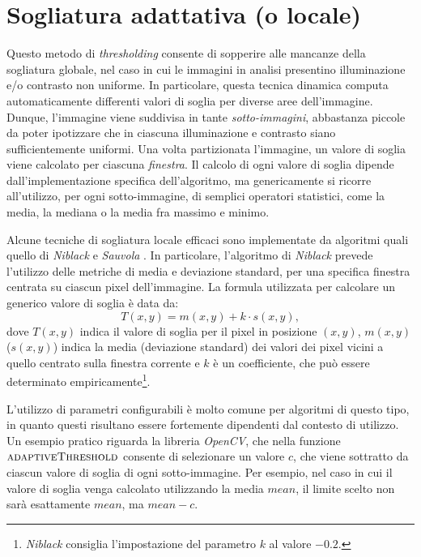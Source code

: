 \section{Sogliatura adattativa (o locale)}
\label{sec:image-bin-local}
Questo metodo di \textit{thresholding} consente di sopperire alle mancanze della sogliatura globale, nel caso in cui le immagini in analisi presentino illuminazione e/o contrasto non uniforme. In particolare, questa tecnica dinamica computa automaticamente differenti valori di soglia per diverse aree dell'immagine. Dunque, l'immagine viene suddivisa in tante \textit{sotto-immagini}, abbastanza piccole da poter ipotizzare che in ciascuna illuminazione e contrasto siano sufficientemente uniformi. Una volta partizionata l'immagine, un valore di soglia viene calcolato per ciascuna \textit{finestra}. Il calcolo di ogni valore di soglia dipende dall'implementazione specifica dell'algoritmo, ma genericamente si ricorre all'utilizzo, per ogni sotto-immagine, di semplici operatori statistici, come la media, la mediana o la media fra massimo e minimo.\par
Alcune tecniche di sogliatura locale efficaci sono implementate da algoritmi quali quello di \textit{Niblack} \cite{bib:niblack} e \textit{Sauvola} \cite{bib:sauvola}. In particolare, l'algoritmo di \textit{Niblack} prevede l'utilizzo delle metriche di media e deviazione standard, per una specifica finestra centrata su ciascun pixel dell'immagine. La formula utilizzata per calcolare un generico valore di soglia \`e data da:
\begin{equation}
	\label{eq:niblack}
	T(x, y) = m(x, y) + k \cdot s(x, y),
\end{equation}
dove $T(x, y)$ indica il valore di soglia per il pixel in posizione $(x, y)$, $m(x, y)$ ($s(x, y)$) indica la media (deviazione standard) dei valori dei pixel vicini a quello centrato sulla finestra corrente e $k$ \`e un coefficiente, che pu\`o essere determinato empiricamente\footnote{\textit{Niblack} consiglia l'impostazione del parametro $k$ al valore $-0.2$.}.\par
L'utilizzo di parametri configurabili \`e molto comune per algoritmi di questo tipo, in quanto questi risultano essere fortemente dipendenti dal contesto di utilizzo. Un esempio pratico riguarda la libreria \textit{OpenCV}, che nella funzione $\textproc{adaptiveThreshold}$ consente di selezionare un valore $c$, che viene sottratto da ciascun valore di soglia di ogni sotto-immagine. Per esempio, nel caso in cui il valore di soglia venga calcolato utilizzando la media $mean$, il limite scelto non sar\`a esattamente $mean$, ma $mean - c$.\par
